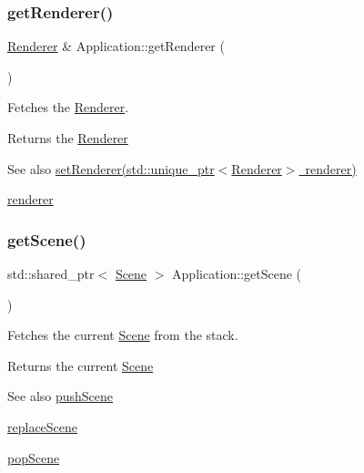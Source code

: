 \subsubsection{\texorpdfstring{getRenderer()}{getRenderer()}}
{\footnotesize\ttfamily \mbox{\hyperlink{classsage_1_1Renderer}{Renderer}} \& Application\+::get\+Renderer (\begin{DoxyParamCaption}{ }\end{DoxyParamCaption})}



Fetches the \mbox{\hyperlink{classsage_1_1Renderer}{Renderer}}. 

\begin{DoxyReturn}{Returns}
the \mbox{\hyperlink{classsage_1_1Renderer}{Renderer}} 
\end{DoxyReturn}
\begin{DoxySeeAlso}{See also}
\mbox{\hyperlink{classsage_1_1Application_a9b9d4014d4913a035e970a16bbc03199}{set\+Renderer(std\+::unique\+\_\+ptr$<$\+Renderer$>$ renderer)}} 

\mbox{\hyperlink{classsage_1_1Application_ac0297e6d65ef3662c807f4026f63c8ba}{renderer}} 
\end{DoxySeeAlso}
\mbox{\label{classsage_1_1Application_a4d40d8fae7f9f26cf45d8fca6e811c3f}} 
\subsubsection{\texorpdfstring{getScene()}{getScene()}}
{\footnotesize\ttfamily std\+::shared\+\_\+ptr$<$ \mbox{\hyperlink{classsage_1_1Scene}{Scene}} $>$ Application\+::get\+Scene (\begin{DoxyParamCaption}{ }\end{DoxyParamCaption})}



Fetches the current \mbox{\hyperlink{classsage_1_1Scene}{Scene}} from the stack. 

\begin{DoxyReturn}{Returns}
the current \mbox{\hyperlink{classsage_1_1Scene}{Scene}} 
\end{DoxyReturn}
\begin{DoxySeeAlso}{See also}
\mbox{\hyperlink{classsage_1_1Application_aa4644a106875cb18286b08131cb807d2}{push\+Scene}} 

\mbox{\hyperlink{classsage_1_1Application_ac0458ccb5b0a4aae4bcb1fc958f369f4}{replace\+Scene}} 

\mbox{\hyperlink{classsage_1_1Application_a47b5bec61b3d93cbb4998b42d0d2ea47}{pop\+Scene}} 
\end{DoxySeeAlso}
\mbox{\label{classsage_1_1Application_a2968bb7e8ae2247aa49d1092f24a751a}} 
